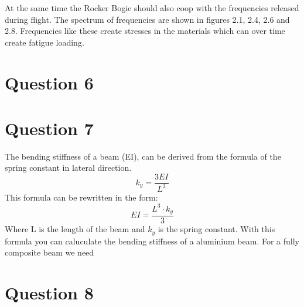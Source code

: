 At the same time the Rocker Bogie should also coop with the frequencies released during flight. The spectrum of frequencies are shown in figures 2.1, 2.4, 2.6 and 2.8. Frequencies like these create stresses in the materials which can over time create fatigue loading.



\section{Question 6}

\section{Question 7}

The bending stiffness of a beam (EI), can be derived from the formula of the spring constant in lateral direction.
\begin{equation}
    k_y= \frac{3EI}{L^3}
\end{equation}
This formula can be rewritten in the form:
\begin{equation}
    EI=\frac{L^3 \cdot k_y}{3}
\end{equation}
Where L is the length of the beam and $k_y$ is the spring constant. With this formula you can caluculate the bending stiffness of a aluminium beam. For a fully composite beam we need 
\section{Question 8}

